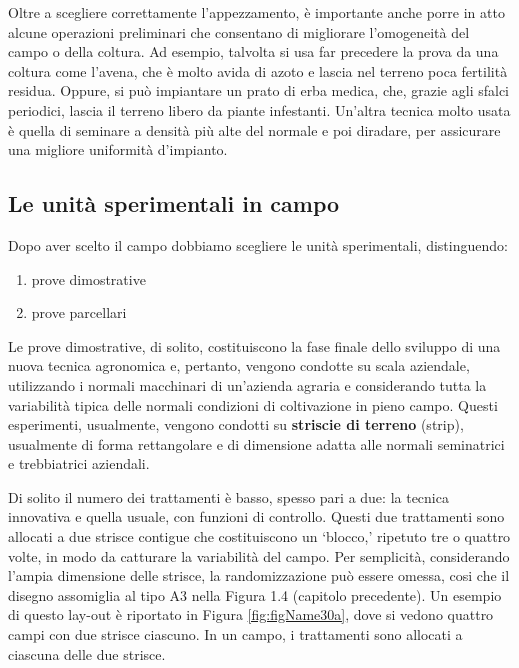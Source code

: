 \documentclass[a4paper,12pt,oneside]{book}
\providecommand{\tightlist}{%
  \setlength{\itemsep}{0pt}\setlength{\parskip}{0pt}}
\begin{document}
Oltre a scegliere correttamente l'appezzamento, è importante anche porre in atto alcune operazioni preliminari che consentano di migliorare l'omogeneità del campo o della coltura. Ad esempio, talvolta si usa far precedere la prova da una coltura come l'avena, che è molto avida di azoto e lascia nel terreno poca fertilità residua. Oppure, si può impiantare un prato di erba medica, che, grazie agli sfalci periodici, lascia il terreno libero da piante infestanti. Un'altra tecnica molto usata è quella di seminare a densità più alte del normale e poi diradare, per assicurare una migliore uniformità d'impianto.

\hypertarget{le-unituxe0-sperimentali-in-campo}{%
\subsection{Le unità sperimentali in campo}\label{le-unituxe0-sperimentali-in-campo}}

Dopo aver scelto il campo dobbiamo scegliere le unità sperimentali, distinguendo:

\begin{enumerate}
\def\labelenumi{\arabic{enumi}.}
\tightlist
\item
  prove dimostrative
\item
  prove parcellari
\end{enumerate}

Le prove dimostrative, di solito, costituiscono la fase finale dello sviluppo di una nuova tecnica agronomica e, pertanto, vengono condotte su scala aziendale, utilizzando i normali macchinari di un'azienda agraria e considerando tutta la variabilità tipica delle normali condizioni di coltivazione in pieno campo. Questi esperimenti, usualmente, vengono condotti su \textbf{striscie di terreno} (strip), usualmente di forma rettangolare e di dimensione adatta alle normali seminatrici e trebbiatrici aziendali.

Di solito il numero dei trattamenti è basso, spesso pari a due: la tecnica innovativa e quella usuale, con funzioni di controllo. Questi due trattamenti sono allocati a due strisce contigue che costituiscono un `blocco,' ripetuto tre o quattro volte, in modo da catturare la variabilità del campo. Per semplicità, considerando l'ampia dimensione delle strisce, la randomizzazione può essere omessa, cosi che il disegno assomiglia al tipo A3 nella Figura 1.4 (capitolo precedente). Un esempio di questo lay-out è riportato in Figura \ref{fig:figName30a}, dove si vedono quattro campi con due strisce ciascuno. In un campo, i trattamenti sono allocati a ciascuna delle due strisce.
\end{document}
